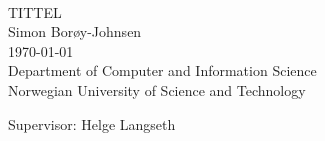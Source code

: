 \thispagestyle{empty}
\mbox{}\\[6pc]
\begin{center}

\Huge{TITTEL}\\[2pc]
\Large{Simon Borøy-Johnsen}\\[2pc]

\monthyear\today\\[2pc]

Department of Computer and Information Science\\
Norwegian University of Science and Technology
\end{center}

\vfill

\noindent Supervisor: Helge Langseth